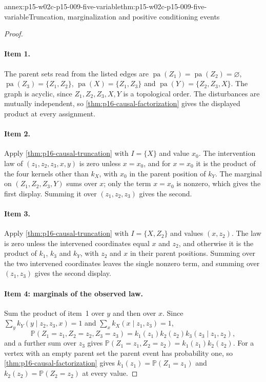 \begin{annexitem}{annex:p15-w02c-p15-009-five-variable}{thm:p15-w02c-p15-009-five-variable}{Truncation, marginalization and positive conditioning events}
\begin{proof}
\paragraph{Item 1.} The parent sets read from the listed edges are
\(\operatorname{pa}(Z_1)=\operatorname{pa}(Z_2)=\varnothing\),
\(\operatorname{pa}(Z_3)=\{Z_1,Z_2\}\),
\(\operatorname{pa}(X)=\{Z_1,Z_3\}\) and
\(\operatorname{pa}(Y)=\{Z_2,Z_3,X\}\). The graph is acyclic, since
\(Z_1,Z_2,Z_3,X,Y\) is a topological order. The disturbances are
mutually independent, so \cref{thm:p16-causal-factorization} gives the
displayed product at every assignment.

\paragraph{Item 2.} Apply \cref{thm:p16-causal-truncation} with
\(I=\{X\}\) and value \(x_0\). The intervention law of
\((z_1,z_2,z_3,x,y)\) is zero unless \(x=x_0\), and for \(x=x_0\) it is
the product of the four kernels other than \(k_X\), with \(x_0\) in the
parent position of \(k_Y\). The marginal on \((Z_1,Z_2,Z_3,Y)\) sums
over \(x\); only the term \(x=x_0\) is nonzero, which gives the first
display. Summing it over \((z_1,z_2,z_3)\) gives the second.

\paragraph{Item 3.} Apply \cref{thm:p16-causal-truncation} with
\(I=\{X,Z_2\}\) and values \((x,z_2)\). The law is zero unless the
intervened coordinates equal \(x\) and \(z_2\), and otherwise it is the
product of \(k_1\), \(k_3\) and \(k_Y\), with \(z_2\) and \(x\) in their
parent positions. Summing over the two intervened coordinates leaves
the single nonzero term, and summing over \((z_1,z_3)\) gives the
second display.

\paragraph{Item 4: marginals of the observed law.} Sum the product of
item~1 over \(y\) and then over \(x\). Since
\(\sum_yk_Y(y\mid z_2,z_3,x)=1\) and \(\sum_xk_X(x\mid z_1,z_3)=1\),
\[
 \mathbb P(Z_1=z_1,Z_2=z_2,Z_3=z_3)
   =k_1(z_1)k_2(z_2)k_3(z_3\mid z_1,z_2),
\]
and a further sum over \(z_3\) gives
\(\mathbb P(Z_1=z_1,Z_2=z_2)=k_1(z_1)k_2(z_2)\). For a vertex with an
empty parent set the parent event has probability one, so
\cref{thm:p16-causal-factorization} gives \(k_1(z_1)=\mathbb P(Z_1=z_1)\)
and \(k_2(z_2)=\mathbb P(Z_2=z_2)\) at every value.


\end{proof}
\end{annexitem}
